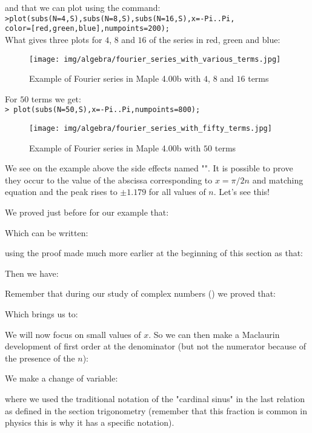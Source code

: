 	\pagebreak
	\begin{tcolorbox}[colframe=black,colback=white,sharp corners]
	and that we can plot using the command:\\
	
	\texttt{>plot({subs(N=4,S),subs(N=8,S),subs(N=16,S)},x=-Pi..Pi,\\
	color=[red,green,blue],numpoints=200);}\\
	
	What gives three plots for $4$, $8$ and $16$ of the series in red, green and blue:
	\begin{figure}[H]
		\centering
		\texttt{[image: img/algebra/fourier\_series\_with\_various\_terms.jpg]}
		\caption{Example of Fourier series in Maple 4.00b with $4$, $8$ and $16$ terms}
	\end{figure}
	For $50$ terms we get:\\
	
	\texttt{> plot(subs(N=50,S),x=-Pi..Pi,numpoints=800);}\\
	\begin{figure}[H]
		\centering
		\texttt{[image: img/algebra/fourier\_series\_with\_fifty\_terms.jpg]}
		\caption{Example of Fourier series in Maple 4.00b with $50$ terms}
	\end{figure}
	\end{tcolorbox}
	We see on the example above the side effects named "". It is possible to prove they occur to the value of the abscissa corresponding to $x=\pi/2n$ and matching equation and the peak rises to $\pm 1.179$ for all values of $n$. Let's see this!
	
	We proved just before for our example that:
	
	Which can be written:
	
	using the proof made much more earlier at the beginning of this section as that:
	
	Then we have:
	
	Remember that during our study of complex numbers () we proved that:
	
	Which brings us to:
	
	We will now focus on small values of $x$. So we can then make a Maclaurin  development of first order at the denominator (but not the numerator because of the presence of the $n$):
	
	We make a change of variable:
	
	where we used the traditional notation of the "cardinal sinus" in the last relation as defined in the section trigonometry (remember that this fraction is common in physics this is why it has a specific notation).
	
